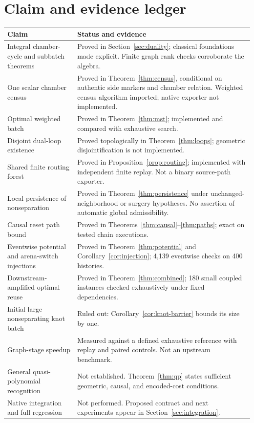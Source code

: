 \documentclass[11pt]{article}
\theoremstyle{definition}
\begin{document}
\section{Claim and evidence ledger}
\small
\begin{longtable}{p{}p{}}
\toprule
Claim & Status and evidence\\
\midrule\endhead
Integral chamber-cycle and subbatch theorems & Proved in Section~\ref{sec:duality}; classical foundations made explicit. Finite graph rank checks corroborate the algebra.\\
One scalar chamber census & Proved in Theorem~\ref{thm:census}, conditional on authentic side markers and chamber relation. Weighted census algorithm imported; native exporter not implemented.\\
Optimal weighted batch & Proved in Theorem~\ref{thm:mst}; implemented and compared with exhaustive search.\\
Disjoint dual-loop existence & Proved topologically in Theorem~\ref{thm:loops}; geometric disjointification is not implemented.\\
Shared finite routing forest & Proved in Proposition~\ref{prop:routing}; implemented with independent finite replay. Not a binary source-path exporter.\\
Local persistence of nonseparation & Proved in Theorem~\ref{thm:persistence} under unchanged-neighborhood or surgery hypotheses. No assertion of automatic global admissibility.\\
Causal reset path bound & Proved in Theorems~\ref{thm:causal}--\ref{thm:paths}; exact on tested chain executions.\\
Eventwise potential and arena-switch injections & Proved in Theorem~\ref{thm:potential} and Corollary~\ref{cor:injection}; 4,139 eventwise checks on 400 histories.\\
Downstream-amplified optimal reuse & Proved in Theorem~\ref{thm:combined}; 180 small coupled instances checked exhaustively under fixed dependencies.\\
Initial large nonseparating knot batch & Ruled out: Corollary~\ref{cor:knot-barrier} bounds its size by one.\\
Graph-stage speedup & Measured against a defined exhaustive reference with replay and paired controls. Not an upstream benchmark.\\
General quasi-polynomial recognition & Not established. Theorem~\ref{thm:qp} states sufficient geometric, causal, and encoded-cost conditions.\\
Native integration and full regression & Not performed. Proposed contract and next experiments appear in Section~\ref{sec:integration}.\\
\bottomrule
\end{longtable}
\normalsize
\end{document}
